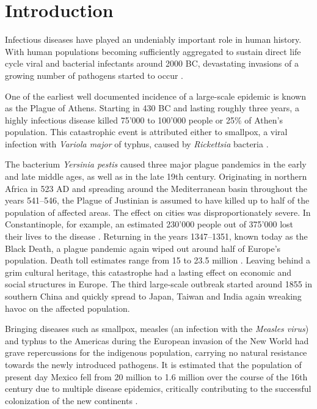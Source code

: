 \chapter{Introduction}

Infectious diseases have played an undeniably important role in human history. With human populations becoming sufficiently aggregated to sustain direct life cycle viral and bacterial infectants around 2000 BC, devastating invasions of a growing number of pathogens started to occur \citep{Dobson1996}.

One of the earliest well documented incidence of a large-scale epidemic is known as the Plague of Athens. Starting in 430 BC and lasting roughly three years, a highly infectious disease killed 75'000 to 100'000 people or 25\% of Athen's population. This catastrophic event is attributed either to smallpox, a viral infection with \textit{Variola major} of typhus, caused by \textit{Rickettsia} bacteria \citep{Littman2009}.

The bacterium \textit{Yersinia pestis} caused three major plague pandemics in the early and late middle ages, as well as in the late 19th century. Originating in northern Africa in 523 AD and spreading around the Mediterranean basin throughout the years 541--546, the Plague of Justinian is assumed to have killed up to half of the population of affected areas. The effect on cities was disproportionately severe. In Constantinople, for example, an estimated 230'000 people out of 375'000 lost their lives to the disease \citep{Treadgold1997}. Returning in the years 1347--1351, known today as the Black Death, a plague pandemic again wiped out around half of Europe's population. Death toll estimates range from 15 to 23.5 million \citep{Zietz2004}. Leaving behind a grim cultural heritage, this catastrophe had a lasting effect on economic and social structures in Europe. The third large-scale outbreak started around 1855 in southern China and quickly spread to Japan, Taiwan and India again wreaking havoc on the affected population.

Bringing diseases such as smallpox, measles (an infection with the \textit{Measles virus}) and typhus to the Americas during the European invasion of the New World had grave repercussions for the indigenous population, carrying no natural resistance towards the newly introduced pathogens. It is estimated that the population of present day Mexico fell from 20 million to 1.6 million over the course of the 16th century due to multiple disease epidemics, critically contributing to the successful colonization of the new continents \citep{Dobson1996}.

